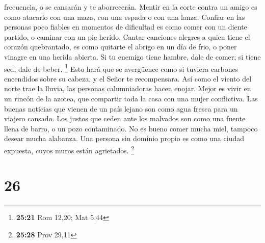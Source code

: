 frecuencia, o se cansarán y te aborrecerán.  Mentir en la
corte contra un amigo es como atacarlo con una maza, con una espada o
con una lanza.  Confiar en las personas poco fiables en
momentos de dificultad es como comer con un diente partido, o caminar
con un pie herido.  Cantar canciones alegres a quien tiene
el corazón quebrantado, es como quitarte el abrigo en un día de frio, o
poner vinagre en una herida abierta.  Si tu enemigo tiene
hambre, dale de comer; si tiene sed, dale de beber. \footnote{\textbf{25:21}
  Rom 12,20; Mat 5,44}  Esto hará que se avergüence como si
tuviera carbones encendidos sobre su cabeza, y el Señor te recompensara.
 Así como el viento del norte trae la lluvia, las personas
calumniadoras hacen enojar.  Mejor es vivir en un rincón de
la azotea, que compartir toda la casa con una mujer conflictiva.
 Las buenas noticias que vienen de un país lejano son como
agua fresca para un viajero cansado.  Los justos que ceden
ante los malvados son como una fuente llena de barro, o un pozo
contaminado.  No es bueno comer mucha miel, tampoco desear
mucha alabanza.  Una persona sin dominio propio es como una
ciudad expuesta, cuyos muros están agrietados. \footnote{\textbf{25:28}
  Prov 29,11}

\hypertarget{section-25}{%
\section{26}\label{section-25}}

